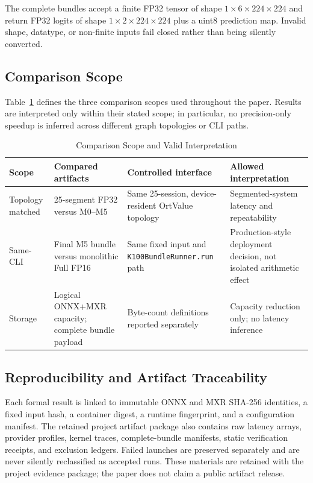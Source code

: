 \documentclass[conference]{IEEEtran}
\begin{document}
The complete bundles accept a finite FP32 tensor of shape $1\times6\times224\times224$ and return FP32 logits of shape $1\times2\times224\times224$ plus a uint8 prediction map. Invalid shape, datatype, or non-finite inputs fail closed rather than being silently converted.

\subsection{Comparison Scope}

Table~\ref{tab:scope} defines the three comparison scopes used throughout the paper. Results are interpreted only within their stated scope; in particular, no precision-only speedup is inferred across different graph topologies or CLI paths.

\begin{table}[t]
\caption{Comparison Scope and Valid Interpretation}
\label{tab:scope}
\centering
\small
\begin{tabular}{p{}p{}p{}p{}}
\toprule
Scope & Compared artifacts & Controlled interface & Allowed interpretation \\
\midrule
Topology matched & 25-segment FP32 versus M0--M5 & Same 25-session, device-resident OrtValue topology & Segmented-system latency and repeatability \\
Same-CLI & Final M5 bundle versus monolithic Full FP16 & Same fixed input and \texttt{K100BundleRunner.run} path & Production-style deployment decision, not isolated arithmetic effect \\
Storage & Logical ONNX+MXR capacity; complete bundle payload & Byte-count definitions reported separately & Capacity reduction only; no latency inference \\
\bottomrule
\end{tabular}
\end{table}

\subsection{Reproducibility and Artifact Traceability}

Each formal result is linked to immutable ONNX and MXR SHA-256 identities, a fixed input hash, a container digest, a runtime fingerprint, and a configuration manifest. The retained project artifact package also contains raw latency arrays, provider profiles, kernel traces, complete-bundle manifests, static verification receipts, and exclusion ledgers. Failed launches are preserved separately and are never silently reclassified as accepted runs. These materials are retained with the project evidence package; the paper does not claim a public artifact release.
\end{document}

